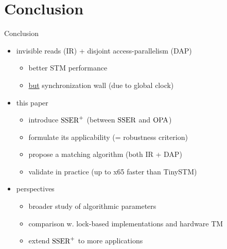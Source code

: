 \section{Conclusion}

\begin{frame}{Conclusion}
  \begin{itemize}
  \item invisible reads (IR) + disjoint access-parallelism (DAP)
    \begin{itemize}
    \item better STM performance
    \item \underline{but} synchronization wall (due to global clock)
    \end{itemize}
  \item this paper
    \begin{itemize}
    \item introduce $\SPSER$ (between $\SSER$ and $\OPA$)
    \item formulate its applicability (= robustness criterion)
    \item propose a matching algorithm (both IR + DAP)
    \item validate in practice (up to x65 faster than TinySTM)
    \end{itemize}
  \item perspectives
    \begin{itemize}
    \item broader study of algorithmic parameters
    \item comparison w. lock-based implementations and hardware TM
    \item extend $\SPSER$ to more applications
    \end{itemize}
  \end{itemize}
\end{frame}
